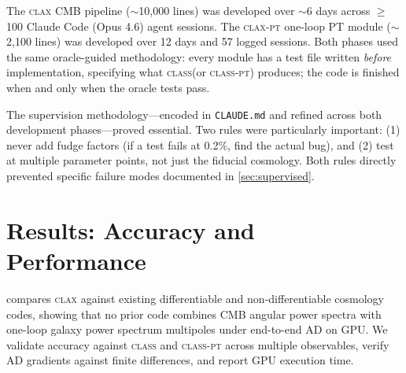 \documentclass{article}
\newcommand{\clax}{\textsc{clax}\xspace}
\newcommand{\claxpt}{\textsc{clax-pt}\xspace}
\newcommand{\class}{\textsc{class}\xspace}
\newcommand{\classpt}{\textsc{class-pt}\xspace}
\begin{document}
The \clax CMB pipeline ($\sim$10,000 lines) was developed over $\sim$6 days across $\geq$100 Claude Code (Opus 4.6) agent sessions.
The \claxpt one-loop PT module ($\sim$2,100 lines) was developed over 12 days and 57 logged sessions.
Both phases used the same oracle-guided methodology: every module has a test file written \emph{before} implementation, specifying what \class (or \classpt) produces; the code is finished when and only when the oracle tests pass.

The supervision methodology---encoded in \texttt{CLAUDE.md} and refined across both development phases---proved essential.
Two rules were particularly important: (1) never add fudge factors (if a test fails at 0.2\%, find the actual bug), and (2) test at multiple parameter points, not just the fiducial cosmology.
Both rules directly prevented specific failure modes documented in \cref{sec:supervised}.

\section{Results: Accuracy and Performance}
\label{sec:results}

 compares \clax against existing differentiable and non-differentiable cosmology codes, showing that no prior code combines CMB angular power spectra with one-loop galaxy power spectrum multipoles under end-to-end AD on GPU.
We validate accuracy against \class and \classpt across multiple observables, verify AD gradients against finite differences, and report GPU execution time.
\end{document}
